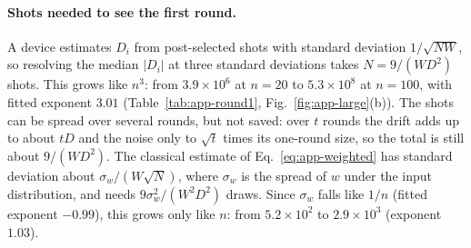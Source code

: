 \paragraph{Shots needed to see the first round.} A device estimates $D_i$ from post-selected shots with standard deviation $1/\sqrt{NW}$, so resolving the median $|D_i|$ at three standard deviations takes $N=9/(WD^2)$ shots. This grows like $n^3$: from $3.9\times10^6$ at $n=20$ to $5.3\times10^8$ at $n=100$, with fitted exponent $3.01$ (Table~\ref{tab:app-round1}, Fig.~\ref{fig:app-large}(b)). The shots can be spread over several rounds, but not saved: over $t$ rounds the drift adds up to about $tD$ and the noise only to $\sqrt t$ times its one-round size, so the total is still about $9/(WD^2)$. The classical estimate of Eq.~\eqref{eq:app-weighted} has standard deviation about $\sigma_w/(W\sqrt N)$, where $\sigma_w$ is the spread of $w$ under the input distribution, and needs $9\sigma_w^2/(W^2D^2)$ draws. Since $\sigma_w$ falls like $1/n$ (fitted exponent $-0.99$), this grows only like $n$: from $5.2\times10^2$ to $2.9\times10^3$ (exponent $1.03$).

